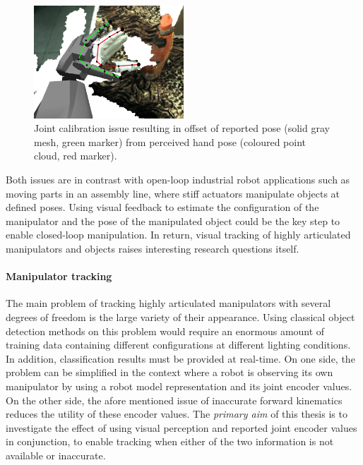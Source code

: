 \begin{figure}
\captionsetup{width=0.6\textwidth}
\centering
\includegraphics[width=0.5\textwidth]{images/valkyrie/joint_calibration_issue.png}
\caption[Joint calibration issue]{Joint calibration issue resulting in offset of reported pose (solid gray mesh, green marker) from perceived hand pose (coloured point cloud, red marker).}
\label{fig:calibration_issue}
\end{figure}

Both issues are in contrast with open-loop industrial robot applications such as moving parts in an assembly line, where stiff actuators manipulate objects at defined poses. Using visual feedback to estimate the configuration of the manipulator and the pose of the manipulated object could be the key step to enable closed-loop manipulation.
In return, visual tracking of highly articulated manipulators and objects raises interesting research questions itself.

\paragraph{Manipulator tracking}
The main problem of tracking highly articulated manipulators with several degrees of freedom is the large variety of their appearance. Using classical object detection methods on this problem would require an enormous amount of training data containing different configurations at different lighting conditions. In addition, classification results must be provided at real-time. On one side, the problem can be simplified in the context where a robot is observing its own manipulator by using a robot model representation and its joint encoder values. On the other side, the afore mentioned issue of inaccurate forward kinematics reduces the utility of these encoder values.
The \emph{primary aim} of this thesis is to investigate the effect of using visual perception and reported joint encoder values in conjunction, to enable tracking when either of the two information is not available or inaccurate.

